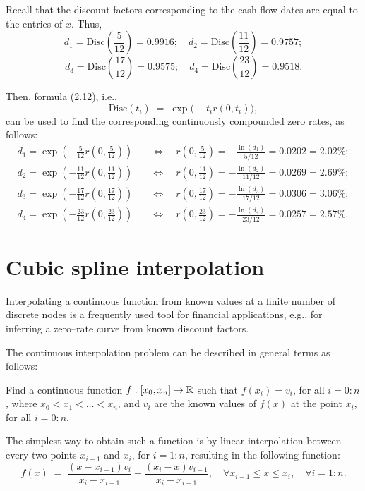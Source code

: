\begin{examplex}
Recall that the discount factors corresponding to the cash flow dates are equal to
the entries of $x$. Thus,
\[
d_1 = \text{Disc}\left(\frac5{12}\right) = 0.9916; \quad
d_2 = \text{Disc}\left(\frac{11}{12}\right) = 0.9757;
\]
\[
d_3 = \text{Disc}\left(\frac{17}{12}\right) = 0.9575; \quad
d_4 = \text{Disc}\left(\frac{23}{12}\right) = 0.9518.
\]

Then, formula (2.12), i.e.,
\[
\text{Disc}(t_i) \;=\; \exp\bigl(-t_ir(0,t_i)\bigr),
\]
can be used to find the corresponding continuously compounded zero rates, as
follows:
\begin{align*}
d_1 = \exp\left(-\frac5{12}r\left(0,\frac5{12}\right)\right) \quad &\Longleftrightarrow
\quad r\left(0,\frac5{12}\right) = -\frac{\ln(d_1)}{5/12} = 0.0202 = 2.02\%; \\
d_2 = \exp\left(-\frac{11}{12}r\left(0,\frac{11}{12}\right)\right) \quad
&\Longleftrightarrow \quad r\left(0,\frac{11}{12}\right) = -\frac{\ln(d_2)}{11/12} =
0.0269 = 2.69\%; \\
d_3 = \exp\left(-\frac{17}{12}r\left(0,\frac{17}{12}\right)\right) \quad
&\Longleftrightarrow \quad r\left(0,\frac{17}{12}\right) = -\frac{\ln(d_3)}{17/12} =
0.0306 = 3.06\%; \\
d_4 = \exp\left(-\frac{23}{12}r\left(0,\frac{23}{12}\right)\right) \quad
&\Longleftrightarrow \quad r\left(0,\frac{23}{12}\right) = -\frac{\ln(d_4)}{23/12} =
0.0257 = 2.57\%.
\end{align*}
\end{examplex}

\section{Cubic spline interpolation}

Interpolating a continuous function from known values at a finite number of
discrete nodes is a frequently used tool for financial applications, e.g., for
inferring a zero--rate curve from known discount factors.

The continuous interpolation problem can be described in general terms as follows:

Find a continuous function $f:[x_0,x_n]\to\mathbb{R}$ such that $f(x_i)=v_i$, for all
$i=0:n$, where $x_0<x_1<\ldots<x_n$, and $v_i$ are the known values of $f(x)$ at
the point $x_i$, for all $i=0:n$.

The simplest way to obtain such a function is by linear interpolation between every
two points $x_{i-1}$ and $x_i$, for $i=1:n$, resulting in the following function:
\[
f(x) \;=\; \frac{(x-x_{i-1})v_i}{x_i-x_{i-1}} + \frac{(x_i-x)v_{i-1}}{x_i-x_{i-1}},
\quad \forall x_{i-1}\le x\le x_i, \quad \forall i=1:n.
\]

